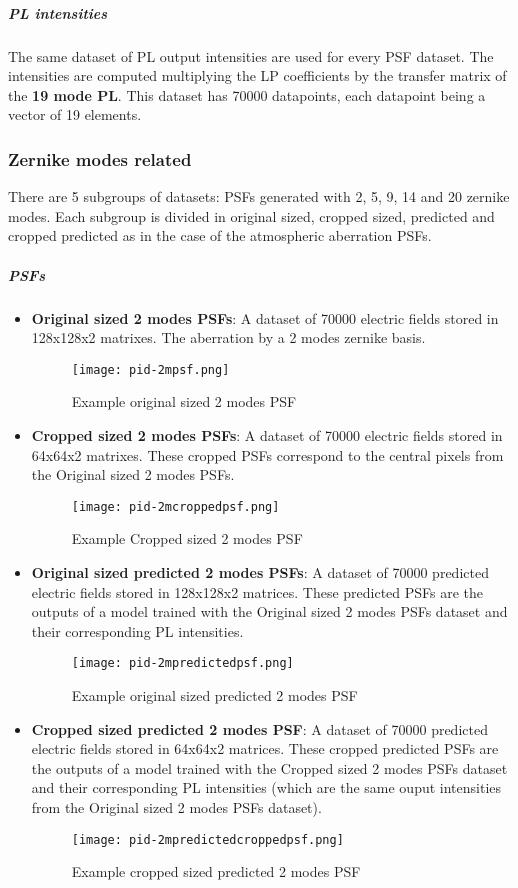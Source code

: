 			
		\subparagraph{PL intensities}
		The same dataset of PL output intensities are used for every PSF dataset. The intensities are computed multiplying the LP coefficients by the transfer matrix of the \textbf{19 mode PL}. This dataset has 70000 datapoints, each datapoint being a vector of 19 elements.
		
	\subsubsection{Zernike modes related}
		There are 5 subgroups of datasets: PSFs generated with 2, 5, 9, 14 and 20 zernike modes. Each subgroup is divided in original sized, cropped sized, predicted and cropped predicted as in the case of the atmospheric aberration PSFs.
		\subparagraph{PSFs}
			\begin{itemize}
				\item \textbf{Original sized 2 modes PSFs}: A dataset of 70000 electric fields stored in 128x128x2 matrixes. The aberration by a 2 modes zernike basis.
				\begin{figure*}[ht!]
					\centering
					\texttt{[image: pid-2mpsf.png]}
					\caption{Example original sized 2 modes PSF}\hspace{\fill}
				\end{figure*}				
				\item \textbf{Cropped sized 2 modes PSFs}:  A dataset of 70000 electric fields stored in 64x64x2 matrixes. These cropped  PSFs correspond to the central pixels from the Original sized 2 modes PSFs.
				\begin{figure*}[ht!]
					\centering
					\texttt{[image: pid-2mcroppedpsf.png]}
					\caption{Example Cropped sized 2 modes PSF}\hspace{\fill}
				\end{figure*}			
				\item \textbf{Original sized predicted 2 modes PSFs}:  A dataset of 70000 predicted electric fields stored in 128x128x2 matrices. These predicted PSFs are the outputs of a model trained with the Original sized 2 modes PSFs dataset and their corresponding PL intensities.
				\begin{figure*}[ht!]
					\centering
					\texttt{[image: pid-2mpredictedpsf.png]}
					\caption{Example original sized predicted 2 modes PSF}\hspace{\fill}
				\end{figure*}			
				\item \textbf{Cropped sized predicted 2 modes PSF}: A dataset of 70000 predicted electric fields stored in 64x64x2 matrices. These cropped predicted PSFs are the outputs of a model trained with the Cropped sized 2 modes PSFs dataset and their corresponding PL intensities (which are the same ouput intensities from the Original sized 2 modes PSFs dataset).
				\begin{figure*}[ht!]
					\centering
					\texttt{[image: pid-2mpredictedcroppedpsf.png]}
					\caption{Example cropped sized predicted 2 modes PSF}\hspace{\fill}
				\end{figure*}
				\FloatBarrier
				

\end{itemize}
